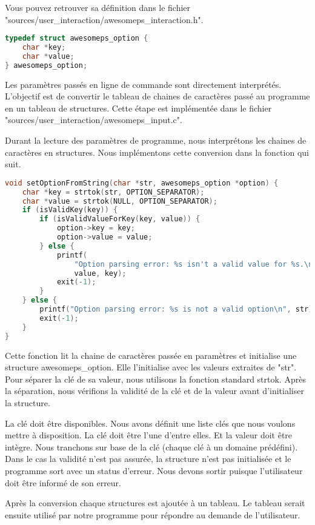 Vous pouvez retrouver sa définition dans le fichier "sources/user\_interaction/awesomeps\_interaction.h".

\begin{lstlisting}[frame=single, language=c]
typedef struct awesomeps_option {
    char *key;
    char *value;
} awesomeps_option;
\end{lstlisting}

Les paramètres passés en ligne de commande sont directement interprétés. L'objectif est de convertir le tableau de chaines de caractères passé au programme en un tableau de structures. Cette étape est implémentée dans le fichier "sources/user\_interaction/awesomeps\_input.c".

Durant la lecture des paramètres de programme, nous interprétons les chaines de caractères en structures. Nous implémentons cette conversion dans la fonction qui suit.

\begin{lstlisting}[frame=single, language=c]
void setOptionFromString(char *str, awesomeps_option *option) {
    char *key = strtok(str, OPTION_SEPARATOR);
    char *value = strtok(NULL, OPTION_SEPARATOR);
    if (isValidKey(key)) {
        if (isValidValueForKey(key, value)) {
            option->key = key;
            option->value = value;
        } else {
            printf(
                "Option parsing error: %s isn't a valid value for %s.\n",
                value, key);
            exit(-1);
        }
    } else {
        printf("Option parsing error: %s is not a valid option\n", str);
        exit(-1);
    }
}
\end{lstlisting}

Cette fonction lit la chaine de caractères passée en paramètres et initialise une structure awesomeps\_option. Elle l'initialise avec les valeurs extraites de "str". Pour séparer la clé de sa valeur, nous utilisons la fonction standard strtok. Après la séparation, nous vérifions la validité de la clé et de la valeur avant d'initialiser la structure.

La clé doit être disponibles. Nous avons définit une liste clés que nous voulons mettre à disposition. La clé doit être l'une d'entre elles. Et la valeur doit être intègre. Nous tranchons sur base de la clé (chaque clé à un domaine prédéfini). Dans le cas la validité n'est pas assurée, la structure n'est pas initialisée et le programme sort avec un status d'erreur. Nous devons sortir puisque l'utilisateur doit être informé de son erreur.

Après la conversion chaque structures est ajoutée à un tableau. Le tableau serait ensuite utilisé par notre programme pour répondre au demande de l'utilisateur.

